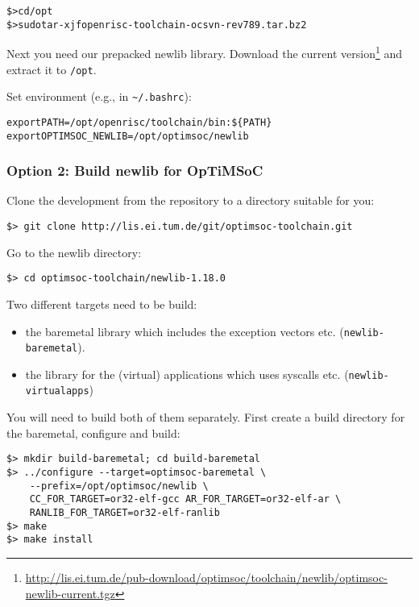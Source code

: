\begin{alltt}
\$> cd /opt
\$> sudo tar -xjf openrisc-toolchain-ocsvn-rev789.tar.bz2
\end{alltt}

Next you need our prepacked newlib library. Download the current
version\footnote{\url{http://lis.ei.tum.de/pub-download/optimsoc/toolchain/newlib/optimsoc-newlib-current.tgz}}
and extract it to \verb|/opt|.

Set environment (e.g., in \verb|~/.bashrc|):

\begin{alltt}
export PATH=/opt/openrisc/toolchain/bin:\$\{PATH\}
export OPTIMSOC_NEWLIB=/opt/optimsoc/newlib
\end{alltt}

\subsubsection{Option 2: Build newlib for OpTiMSoC}

Clone the development from the repository to a directory suitable for
you:

\begin{verbatim}
$> git clone http://lis.ei.tum.de/git/optimsoc-toolchain.git
\end{verbatim}

Go to the newlib directory:

\begin{verbatim}
$> cd optimsoc-toolchain/newlib-1.18.0
\end{verbatim}

Two different targets need to be build:
\begin{itemize}
\item the baremetal library which includes the exception vectors etc.
  (\verb|newlib-baremetal|).
\item the library for the (virtual) applications which uses syscalls
  etc.  (\verb|newlib-virtualapps|)
\end{itemize}

You will need to build both of them separately. First create a build
directory for the baremetal, configure and build:

\begin{verbatim}
$> mkdir build-baremetal; cd build-baremetal
$> ../configure --target=optimsoc-baremetal \
    --prefix=/opt/optimsoc/newlib \
    CC_FOR_TARGET=or32-elf-gcc AR_FOR_TARGET=or32-elf-ar \
    RANLIB_FOR_TARGET=or32-elf-ranlib
$> make
$> make install
\end{verbatim}

